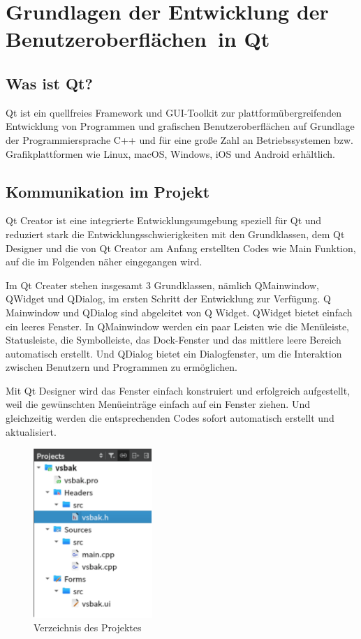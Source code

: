 \chapter{Grundlagen der Entwicklung der Benutzeroberflächen in Qt}

\section{Was ist Qt? }
Qt ist ein quellfreies Framework und GUI-Toolkit zur plattformübergreifenden Entwicklung von Programmen und grafischen Benutzeroberflächen auf Grundlage der Programmiersprache C++ und für eine große Zahl an Betriebssystemen bzw. Grafikplattformen wie Linux, macOS, Windows, iOS und Android erhältlich.

\section {Kommunikation im Projekt}
Qt Creator ist eine integrierte Entwicklungsumgebung speziell für Qt und reduziert stark die Entwicklungsschwierigkeiten mit den Grundklassen, dem Qt Designer und die von Qt Creator am Anfang erstellten Codes wie Main Funktion, auf die im Folgenden näher eingegangen wird.   
\par Im Qt Creater stehen insgesamt 3 Grundklassen, nämlich QMainwindow, QWidget und QDialog, im ersten Schritt der Entwicklung zur Verfügung.  Q Mainwindow und QDialog sind abgeleitet von Q Widget. QWidget bietet einfach ein leeres Fenster. In QMainwindow  werden ein paar Leisten wie die Menüleiste, Statusleiste, die Symbolleiste, das Dock-Fenster und das mittlere leere Bereich automatisch erstellt. Und QDialog bietet ein Dialogfenster, um die Interaktion zwischen Benutzern und Programmen zu ermöglichen.
\par Mit Qt Designer wird das Fenster einfach konstruiert und erfolgreich aufgestellt, weil die gewünschten Menüeinträge einfach auf ein Fenster ziehen.  Und gleichzeitig werden die entsprechenden Codes sofort automatisch erstellt und aktualisiert.

\begin{figure}[h!]
	\centering
	\includegraphics[width=0.4\textwidth]{bilder/verzeichnis.png}
	\caption{Verzeichnis des Projektes}
	\label{Abbildung_2}
\end{figure}

